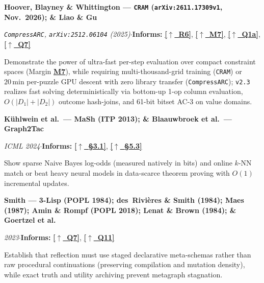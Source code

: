 \documentclass[12pt]{article}
\newcommand{\secback}[2]{\hyperref[#1]{\textcolor{linkblue}{\textbf{\small[\(\uparrow\)~#2]}}}}
\newcommand{\litentry}[4]{%
  \par\medskip\noindent\hypertarget{lit:#1}{}%
  \textbf{#2}\par\nopagebreak\noindent
  {\footnotesize\textit{#3}\quad$\cdot$\quad\textbf{Informs:} #4}\par\nopagebreak\smallskip\noindent\ignorespaces
}
\begin{document}
\litentry{hoover2026}{Hoover, Blayney \& Whittington --- \texttt{CRAM} (\texttt{arXiv:2611.17309v1}, Nov.\ 2026); \& \hypertarget{lit:liao2025}{}Liao \& Gu}{\texttt{CompressARC}, \texttt{arXiv:2512.06104} (2025)}{\secback{sec:thesis}{R6}, \secback{sec:marginalia}{M7}, \secback{ans:1a}{Q1a}, \secback{ans:7}{Q7}}
Demonstrate the power of ultra-fast per-step evaluation over compact constraint spaces (Margin \hyperlink{q:m7}{\textbf{M7}}), while requiring multi-thousand-grid training (\texttt{CRAM}) or $20\,\mathrm{min}$ per-puzzle GPU descent with zero library transfer (\texttt{CompressARC}); \texttt{v2.3} realizes fast solving deterministically via bottom-up 1-op column evaluation, $O(|D_1|+|D_2|)$ outcome hash-joins, and 61-bit bitset AC-3 on value domains.

\litentry{kuhlwein2013}{K\"uhlwein et al.\ --- MaSh (ITP 2013); \& \hypertarget{lit:blaauwbroek2024}{}Blaauwbroek et al.\ --- Graph2Tac}{ICML 2024}{\secback{sec:v2b-accounting}{\S3.1}, \secback{sec:arch-geom}{\S5.3}}
Show sparse Naive Bayes log-odds (measured natively in bits) and online $k$-NN match or beat heavy neural models in data-scarce theorem proving with $O(1)$ incremental updates.

\litentry{smith1984}{Smith --- 3-Lisp (POPL 1984); \hypertarget{lit:desrivieres1984}{}des~Rivi\`eres \& Smith (1984); \hypertarget{lit:maes1987}{}Maes (1987); \hypertarget{lit:amin2018}{}Amin \& Rompf (POPL 2018); \hypertarget{lit:lenat1984}{}Lenat \& Brown (1984); \& \hypertarget{lit:goertzel2023}{}Goertzel et al.}{2023}{\secback{ans:7}{Q7}, \secback{ans:11}{Q11}}
Establish that reflection must use staged declarative meta-schemas rather than raw procedural continuations (preserving compilation and mutation density), while exact truth and utility archiving prevent metagraph stagnation.
\end{document}
